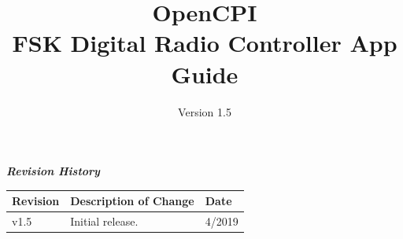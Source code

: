 \def\docTitle{OpenCPI\\ FSK Digital Radio Controller App Guide}
\def\docVersion{1.5} %
\def\snippetpath{../../../../../doc/av/tex/snippets}


\date{Version \docVersion} %
\title{\docTitle}
\usepackage{graphicx}
\graphicspath{ {figures/} }
\usepackage{textcomp}
\usepackage{listings}


\maketitle

\begin{center}
  \textit{\textbf{Revision History}}
  \begin{longtable}{|p{}
                    |p{}
                    |p{}|}
    \hline
    \rowcolor{blue}
    \textbf{Revision} & \textbf{Description of Change} & \textbf{Date} \\
    \hline
    v1.5 & Initial release. & 4/2019 \\
    \hline
  \end{longtable}
\end{center}

